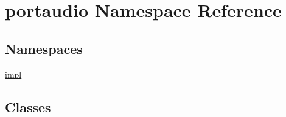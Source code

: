 \hypertarget{namespaceportaudio}{}\section{portaudio Namespace Reference}
\label{namespaceportaudio}
\subsection*{Namespaces}
\begin{DoxyCompactItemize}
\item 
 \hyperlink{namespaceportaudio_1_1impl}{impl}
\end{DoxyCompactItemize}
\subsection*{Classes}

